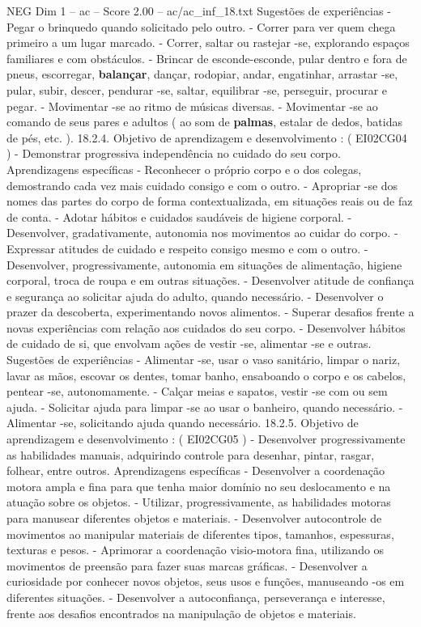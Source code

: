 \begin{textsample}{NEG Dim 1 – ac – Score 2.00 – ac/ac\_inf\_18.txt}
Sugestões de experiências - Pegar o brinquedo quando solicitado pelo outro. - Correr para ver quem chega primeiro a um lugar marcado. - Correr, saltar ou rastejar -se, explorando espaços familiares e com obstáculos. - Brincar de esconde-esconde, pular dentro e fora de pneus, escorregar, \textbf{balançar}, dançar, rodopiar, andar, engatinhar, arrastar -se, pular, subir, descer, pendurar -se, saltar, equilibrar -se, perseguir, procurar e pegar. - Movimentar -se ao ritmo de músicas diversas. - Movimentar -se ao comando de seus pares e adultos ( ao som de \textbf{palmas}, estalar de dedos, batidas de pés, etc. ). 18.2.4.
Objetivo de aprendizagem e desenvolvimento : ( EI02CG04 ) - Demonstrar progressiva independência no cuidado do seu corpo.
Aprendizagens específicas - Reconhecer o próprio corpo e o dos colegas, demostrando cada vez mais cuidado consigo e com o outro. - Apropriar -se dos nomes das partes do corpo de forma contextualizada, em situações reais ou de faz de conta. - Adotar hábitos e cuidados saudáveis de higiene corporal. - Desenvolver, gradativamente, autonomia nos movimentos ao cuidar do corpo. - Expressar atitudes de cuidado e respeito consigo mesmo e com o outro. - Desenvolver, progressivamente, autonomia em situações de alimentação, higiene corporal, troca de roupa e em outras situações. - Desenvolver atitude de confiança e segurança ao solicitar ajuda do adulto, quando necessário. - Desenvolver o prazer da descoberta, experimentando novos alimentos. - Superar desafios frente a novas experiências com relação aos cuidados do seu corpo. - Desenvolver hábitos de cuidado de si, que envolvam ações de vestir -se, alimentar -se e outras.
Sugestões de experiências - Alimentar -se, usar o vaso sanitário, limpar o nariz, lavar as mãos, escovar os dentes, tomar banho, ensaboando o corpo e os cabelos, pentear -se, autonomamente. - Calçar meias e sapatos, vestir -se com ou sem ajuda. - Solicitar ajuda para limpar -se ao usar o banheiro, quando necessário. - Alimentar -se, solicitando ajuda quando necessário. 18.2.5.
Objetivo de aprendizagem e desenvolvimento : ( EI02CG05 ) - Desenvolver progressivamente as habilidades manuais, adquirindo controle para desenhar, pintar, rasgar, folhear, entre outros.
Aprendizagens específicas - Desenvolver a coordenação motora ampla e fina para que tenha maior domínio no seu deslocamento e na atuação sobre os objetos. - Utilizar, progressivamente, as habilidades motoras para manusear diferentes objetos e materiais. - Desenvolver autocontrole de movimentos ao manipular materiais de diferentes tipos, tamanhos, espessuras, texturas e pesos. - Aprimorar a coordenação visio-motora fina, utilizando os movimentos de preensão para fazer suas marcas gráficas. - Desenvolver a curiosidade por conhecer novos objetos, seus usos e funções, manuseando -os em diferentes situações. - Desenvolver a autoconfiança, perseverança e interesse, frente aos desafios encontrados na manipulação de objetos e materiais.

\end{textsample}
